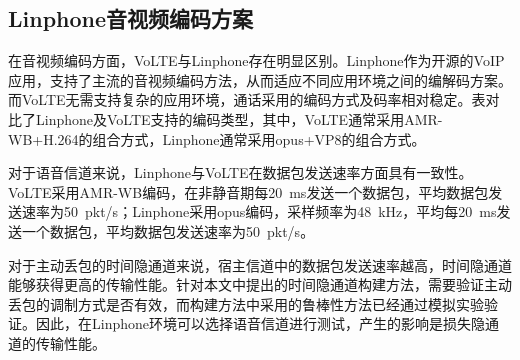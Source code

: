 \subsection{Linphone音视频编码方案}
\label{chap:linphone:motivation:coding}


在音视频编码方面，VoLTE与Linphone存在明显区别。Linphone作为开源的VoIP应用，支持了主流的音视频编码方法，从而适应不同应用环境之间的编解码方案。而VoLTE无需支持复杂的应用环境，通话采用的编码方式及码率相对稳定。表对比了Linphone及VoLTE支持的编码类型，其中，VoLTE通常采用AMR-WB+H.264的组合方式，Linphone通常采用opus+VP8的组合方式。

对于语音信道来说，Linphone与VoLTE在数据包发送速率方面具有一致性。VoLTE采用AMR-WB编码，在非静音期每{20\ ms}发送一个数据包，平均数据包发送速率为{50\ pkt/s}；Linphone采用opus编码，采样频率为{48\ kHz}，平均每{20\ ms}发送一个数据包，平均数据包发送速率为{50\ pkt/s}。

对于主动丢包的时间隐通道来说，宿主信道中的数据包发送速率越高，时间隐通道能够获得更高的传输性能。针对本文中提出的时间隐通道构建方法，需要验证主动丢包的调制方式是否有效，而构建方法中采用的鲁棒性方法已经通过模拟实验验证。因此，在Linphone环境可以选择语音信道进行测试，产生的影响是损失隐通道的传输性能。

